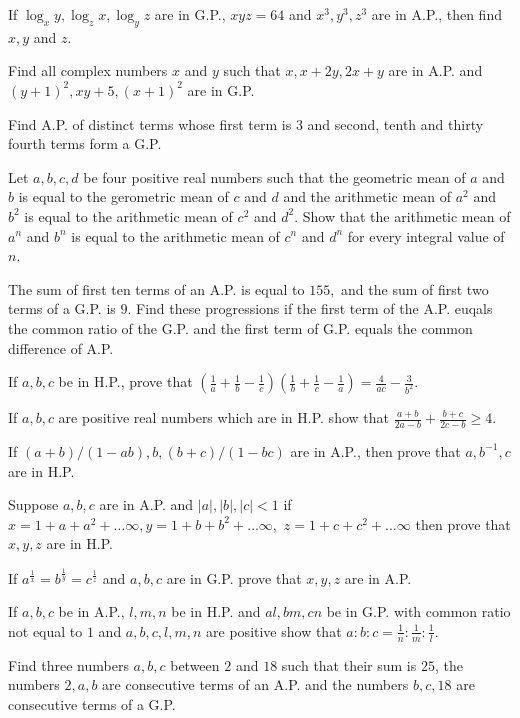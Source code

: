 \item If $\log_xy, \log_zx, \log_yz$ are in G.P., $xyz = 64$ and $x^3, y^3, z^3$ are in A.P., then find $x, y$ and $z.$
\item Find all complex numbers $x$ and $y$ such that $x, x + 2y, 2x + y$ are in A.P. and $(y + 1)^2, xy + 5, (x + 1)^2$
  are in G.P.
\item Find A.P. of distinct terms whose first term is $3$ and second, tenth and thirty fourth terms form a G.P.
\item Let $a, b, c, d$ be four positive real numbers such that the geometric mean of $a$ and $b$ is equal to the
  gerometric mean of $c$ and $d$ and the arithmetic mean of $a^2$ and $b^2$ is equal to the arithmetic mean of $c^2$ and $d^2.$
  Show that the arithmetic mean of $a^n$ and $b^n$ is equal to the arithmetic mean of $c^n$ and $d^n$ for every integral value of
  $n$.
\item The sum of first ten terms of an A.P. is equal to $155,$ and the sum of first two terms of a G.P. is $9.$ Find
  these progressions if the first term of the A.P. euqals the common ratio of the G.P. and the first term of G.P. equals the common
  difference of A.P.
\item If $a, b, c$ be in H.P., prove that $\left(\frac{1}{a} + \frac{1}{b} - \frac{1}{c}\right)\left(\frac{1}{b} +
  \frac{1}{c} - \frac{1}{a}\right) = \frac{4}{ac} - \frac{3}{b^2}$.
\item If $a, b, c$ are positive real numbers which are in H.P. show that $\frac{a + b}{2a - b} + \frac{b + c}{2c - b}\geq
  4$.
\item If $(a + b)/(1 - ab), b, (b + c)/(1 - bc)$ are in A.P., then prove that $a, b^{-1}, c$ are in H.P.
\item Suppose $a, b, c$ are in A.P. and $|a|, |b|, |c| < 1$ if $x = 1 + a + a^2 + \ldots \infty, y = 1 + b + b^2 + \ldots
  \infty,$ $z = 1 + c + c^2 + \ldots \infty$ then prove that $x, y, z$ are in H.P.
\item If $a^{\frac{1}{x}} = b^{\frac{1}{y}} = c^{\frac{1}{z}}$ and $a, b, c$ are in G.P. prove that $x, y, z$ are in A.P.
\item If $a, b, c$ be in A.P., $l, m, n$ be in H.P. and $al, bm, cn$ be in G.P. with common ratio not equal to $1$ and
  $a, b, c, l, m, n$ are positive show that $a:b:c = \frac{1}{n}:\frac{1}{m}:\frac{1}{l}$.
\item Find three numbers $a, b, c$ between $2$ and $18$ such that their sum is $25$, the numbers $2, a, b$ are
  consecutive terms of an A.P. and the numbers $b, c, 18$ are consecutive terms of a G.P.
